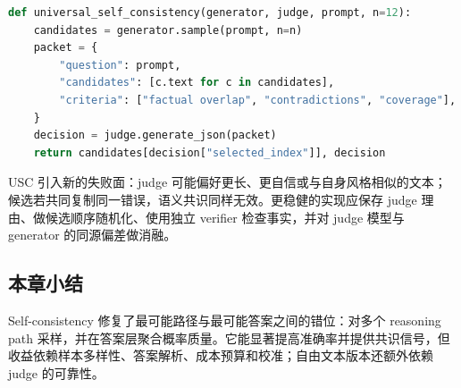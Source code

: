 
\begin{lstlisting}[language=Python,caption={自由文本 Universal Self-Consistency 的结构化实现}]
def universal_self_consistency(generator, judge, prompt, n=12):
    candidates = generator.sample(prompt, n=n)
    packet = {
        "question": prompt,
        "candidates": [c.text for c in candidates],
        "criteria": ["factual overlap", "contradictions", "coverage"],
    }
    decision = judge.generate_json(packet)
    return candidates[decision["selected_index"]], decision
\end{lstlisting}

USC 引入新的失败面：judge 可能偏好更长、更自信或与自身风格相似的文本；候选若共同复制同一错误，语义共识同样无效。更稳健的实现应保存 judge 理由、做候选顺序随机化、使用独立 verifier 检查事实，并对 judge 模型与 generator 的同源偏差做消融。


\subsection{本章小结}

Self-consistency 修复了最可能路径与最可能答案之间的错位：对多个 reasoning path 采样，并在答案层聚合概率质量。它能显著提高准确率并提供共识信号，但收益依赖样本多样性、答案解析、成本预算和校准；自由文本版本还额外依赖 judge 的可靠性。

